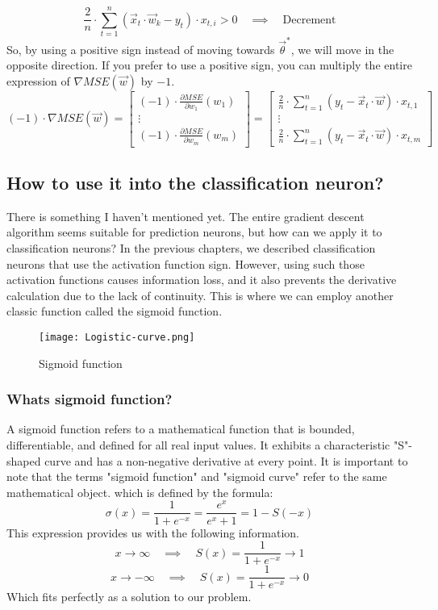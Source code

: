 \[
\frac{2}{n} \cdot \sum_{t = 1}^n(\vec{x}_t \cdot \vec{w}_k - y_t) \cdot x_{t, i} > 0 \quad \implies \quad
\text{Decrement}
\]
So, by using a positive sign instead of moving towards $\vec{\theta}^*$, we will move in the opposite direction.
If you prefer to use a positive sign, you can multiply the entire expression of $\nabla MSE(\vec{w})$ by $-1$.
\[
(-1) \cdot \nabla MSE(\vec{w}) = \begin{bmatrix} (-1) \cdot \frac{\partial MSE}{\partial w_1}(w_1)
  \\ \vdots
  \\ (-1) \cdot \frac{\partial MSE}{\partial w_m}(w_m)
\end{bmatrix} =
\begin{bmatrix} \frac{2}{n} \cdot \sum_{t = 1}^n(y_t - \vec{x}_t \cdot \vec{w}) \cdot x_{t, 1}
  \\ \vdots
  \\ \frac{2}{n} \cdot \sum_{t = 1}^n(y_t - \vec{x}_t \cdot \vec{w}) \cdot x_{t, m}
\end{bmatrix} 
\]

\subsection{How to use it into the classification neuron?}
There is something I haven't mentioned yet. The entire gradient descent algorithm seems suitable for prediction
neurons, but how can we apply it to classification neurons? In the previous chapters, we described
classification neurons that use the activation function sign. However, using such those activation functions
causes
information loss, and it also prevents the derivative calculation due to the lack of continuity.
This is where we can employ another classic function called the sigmoid function.
\begin{figure}[H]
  \centering
  \texttt{[image: Logistic-curve.png]}
  \caption{Sigmoid function}
\end{figure}

\subsubsection{Whats sigmoid function?}
A sigmoid function refers to a mathematical function that is bounded, differentiable, and defined for all real
input values. It exhibits a characteristic "S"-shaped curve and has a non-negative derivative at every point.
It is important to note that the terms "sigmoid function" and "sigmoid curve" refer to the same mathematical
object. which is defined by the formula:
\[
\sigma(x) = \frac{1}{1 + e^{-x}} = \frac{e^x}{e^x + 1} = 1 - S(-x)
\]
This expression provides us with the following information.
\[
x \rightarrow \infty \quad \implies \quad S(x) = \frac{1}{1 + e^{-x}} \rightarrow 1
\]
\[
x \rightarrow  - \infty \quad \implies \quad S(x) = \frac{1}{1 + e^{-x}} \rightarrow 0
\]
Which fits perfectly as a solution to our problem.
